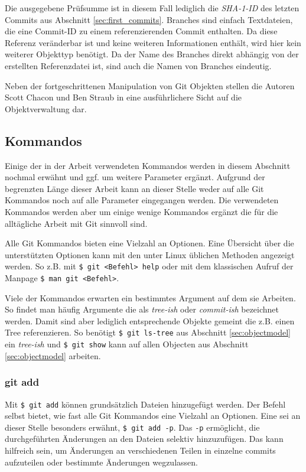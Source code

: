 Die ausgegebene Prüfsumme ist in diesem Fall lediglich die \textit{SHA-1-ID} des
letzten Commits aus Abschnitt \ref{sec:first_commits}. Branches sind einfach
Textdateien, die eine Commit-ID zu einem referenzierenden Commit enthalten. Da
diese Referenz veränderbar ist und keine weiteren Informationen enthält, wird
hier kein weiterer Objekttyp benötigt. Da der Name des Branches direkt abhängig
von der erstellten Referenzdatei ist, sind auch die Namen von Branches
eindeutig.

Neben der fortgeschrittenen Manipulation von Git Objekten stellen die Autoren
Scott Chacon und Ben Straub in \cite[S.~408-418]{progit} eine ausführlichere
Sicht auf die Objektverwaltung dar.

\subsection{Kommandos}\label{sec:commands}
Einige der in der Arbeit verwendeten Kommandos werden in diesem Abschnitt
nochmal erwähnt und ggf. um weitere Parameter ergänzt. Aufgrund der begrenzten
Länge dieser Arbeit kann an dieser Stelle weder auf alle Git Kommandos noch auf
alle Parameter eingegangen werden. Die verwendeten Kommandos werden aber um
einige wenige Kommandos ergänzt die für die alltägliche Arbeit mit Git sinnvoll
sind.

Alle Git Kommandos bieten eine Vielzahl an Optionen. Eine Übersicht über die
unterstützten Optionen kann mit den unter Linux üblichen Methoden angezeigt
werden. So z.B. mit \texttt{\$ git <Befehl> help} oder mit dem klassischen
Aufruf der Manpage \texttt{\$ man git <Befehl>}.

Viele der Kommandos erwarten ein bestimmtes Argument auf dem sie Arbeiten. So
findet man häufig Argumente die als \textit{tree-ish} oder \textit{commit-ish}
bezeichnet werden. Damit sind aber lediglich entsprechende Objekte gemeint die
z.B. einen Tree referenzieren.\cite[52]{gitosp} So benötigt \texttt{\$ git
ls-tree} aus Abschnitt \ref{sec:objectmodel} ein \textit{tree-ish} und
\texttt{\$ git show} kann auf allen Objecten aus Abschnitt
\ref{sec:objectmodel} arbeiten.

\subsubsection{git add}\label{sec:gitadd}
Mit \texttt{\$ git add} können grundsätzlich Dateien hinzugefügt werden. Der
Befehl selbst bietet, wie fast alle Git Kommandos eine Vielzahl an Optionen.
Eine sei an dieser Stelle besonders erwähnt, \texttt{\$ git add -p}. Das
\texttt{-p} ermöglicht, die durchgeführten Änderungen an den Dateien selektiv
hinzuzufügen. Das kann hilfreich sein, um Änderungen an verschiedenen Teilen in
einzelne \glspl{commit} aufzuteilen oder bestimmte Änderungen wegzulassen.

